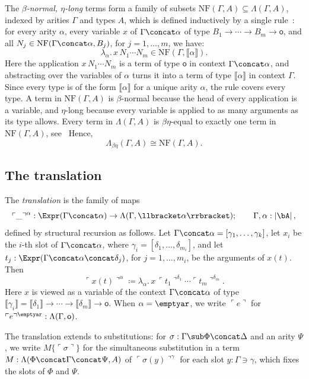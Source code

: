 The \emph{$\beta$-normal, $\eta$-long} terms form a family of subsets $\mathrm{NF}(\Gamma, A) \subseteq \Lambda(\Gamma, A)$, indexed by arities $\Gamma$ and types $A$, which is defined inductively by a single rule~\cite[\S3.1]{KellerAltenkirch2010}: for every arity $\alpha$, every variable $x$ of $\Gamma \concat \alpha$ of type $B_1 \to \cdots \to B_m \to \mathsf{o}$, and all $N_j \in \mathrm{NF}(\Gamma \concat \alpha, B_j)$, for $j = 1, \ldots, m$, we have:
\[
\lambda_\alpha.\, x\, N_1 \cdots N_m \in \mathrm{NF}(\Gamma, \llbracket \alpha \rrbracket).
\]
Here the application $x\, N_1 \cdots N_m$ is a term of type $\mathsf{o}$ in context $\Gamma \concat \alpha$, and abstracting over the variables of $\alpha$ turns it into a term of type $\llbracket \alpha \rrbracket$ in context $\Gamma$. Since every type is of the form $\llbracket \alpha \rrbracket$ for a unique arity $\alpha$, the rule covers every type. A term in $\mathrm{NF}(\Gamma, A)$ is $\beta$-normal because the head of every application is a variable, and $\eta$-long because every variable is applied to as many arguments as its type allows. Every term in $\Lambda(\Gamma, A)$ is $\beta\eta$-equal to exactly one term in $\mathrm{NF}(\Gamma, A)$, see~\cite{JayGhani1995} Hence,
\[
\Lambda_{\beta\eta}(\Gamma,A) \cong \mathrm{NF}(\Gamma, A).
\]

\subsection{The translation}

\begin{definition}\label{def:translation}
    The \emph{translation} is the family of maps
    \[
    \ulcorner \_ \urcorner^\alpha : \Expr(\Gamma \concat \alpha) \to \Lambda(\Gamma, \llbracket \alpha \rrbracket); \qquad \Gamma, \alpha : \left|\bA\right|,
    \]
    defined by structural recursion as follows. Let $\Gamma \concat \alpha = [\gamma_1, \ldots, \gamma_k]$, let $x_i$ be the $i$-th slot of $\Gamma \concat \alpha$, where $\gamma_i = [\delta_1, \ldots, \delta_{m_i}]$, and let $t_j : \Expr(\Gamma \concat \alpha \concat \delta_j)$, for $j = 1, \ldots, m_i$, be the arguments of $x(t)$. Then
    \[
    \ulcorner x(t) \urcorner^\alpha \coloneqq \lambda_\alpha.\, x\, \ulcorner t_1 \urcorner^{\delta_1} \cdots \ulcorner t_m \urcorner^{\delta_m}.
    \]
    Here $x$ is viewed as a variable of the context $\Gamma \concat \alpha$ of type $\llbracket \gamma_i \rrbracket = \llbracket \delta_1 \rrbracket \to \cdots \to \llbracket \delta_m \rrbracket \to \mathsf{o}$. When $\alpha = \emptyar$, we write $\ulcorner e \urcorner$ for $\ulcorner e \urcorner^{\emptyar} : \Lambda(\Gamma, \mathsf{o})$.

    The translation extends to substitutions: for $\sigma : \Gamma \sub \Phi \concat \Delta$ and an arity $\Psi$, we write $M\{\ulcorner \sigma \urcorner\}$ for the simultaneous substitution in a term $M : \Lambda(\Phi \concat \Gamma \concat \Psi, A)$ of $\ulcorner \sigma(y) \urcorner^\gamma$ for each slot $y : \Gamma \ni \gamma$, which fixes the slots of $\Phi$ and $\Psi$.
\end{definition}


